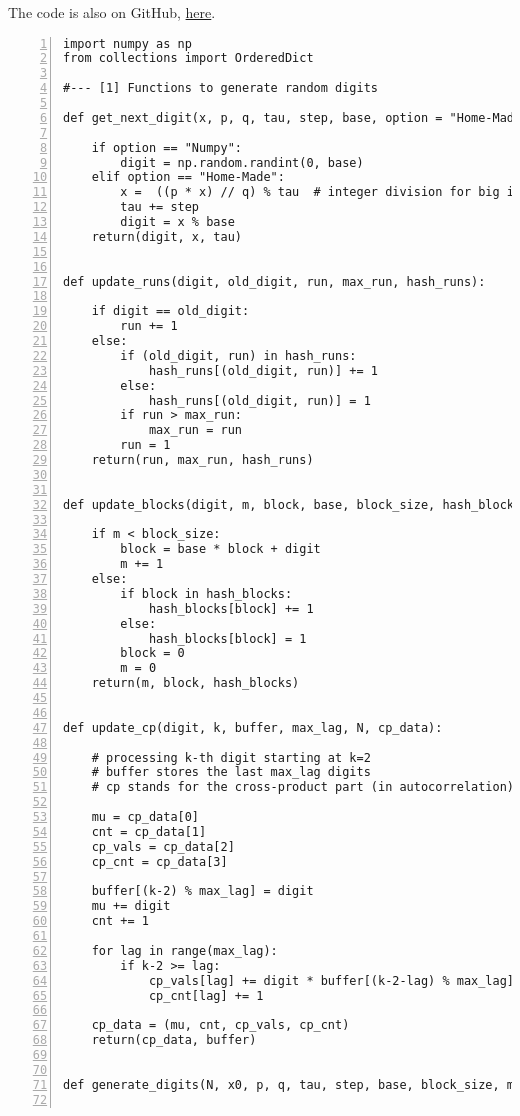 \documentclass[oneside,10pt]{book}
\begin{document}
The code is also on GitHub, \href{https://github.com/VincentGranville/Statistical-Optimization/blob/main/pnrg_tests.py}{here}.
\vspace{1ex}
\begin{lstlisting}[numbers=left]
import numpy as np
from collections import OrderedDict

#--- [1] Functions to generate random digits

def get_next_digit(x, p, q, tau, step, base, option = "Home-Made"):

    if option == "Numpy":
        digit = np.random.randint(0, base)
    elif option == "Home-Made":
        x =  ((p * x) // q) % tau  # integer division for big int
        tau += step
        digit = x % base
    return(digit, x, tau)


def update_runs(digit, old_digit, run, max_run, hash_runs):

    if digit == old_digit:
        run += 1
    else:
        if (old_digit, run) in hash_runs:
            hash_runs[(old_digit, run)] += 1
        else:
            hash_runs[(old_digit, run)] = 1
        if run > max_run:
            max_run = run
        run = 1
    return(run, max_run, hash_runs)


def update_blocks(digit, m, block, base, block_size, hash_blocks):

    if m < block_size:
        block = base * block + digit
        m += 1
    else:
        if block in hash_blocks:
            hash_blocks[block] += 1
        else:
            hash_blocks[block] = 1
        block = 0
        m = 0
    return(m, block, hash_blocks)


def update_cp(digit, k, buffer, max_lag, N, cp_data):

    # processing k-th digit starting at k=2
    # buffer stores the last max_lag digits
    # cp stands for the cross-product part (in autocorrelation)

    mu = cp_data[0]
    cnt = cp_data[1]
    cp_vals = cp_data[2]
    cp_cnt = cp_data[3]

    buffer[(k-2) % max_lag] = digit
    mu += digit
    cnt += 1

    for lag in range(max_lag):
        if k-2 >= lag: 
            cp_vals[lag] += digit * buffer[(k-2-lag) % max_lag]
            cp_cnt[lag] += 1

    cp_data = (mu, cnt, cp_vals, cp_cnt)
    return(cp_data, buffer)


def generate_digits(N, x0, p, q, tau, step, base, block_size, max_lag, option = "Home-Made"):


\end{lstlisting}
\end{document}
